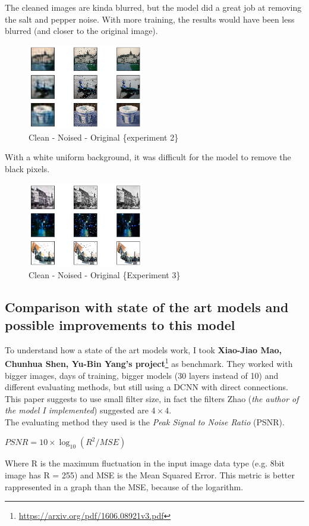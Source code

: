 \documentclass[twocolumn,showpacs,%
  nofootinbib,aps,superscriptaddress,%
  eqsecnum,prd,notitlepage,showkeys,10pt]{revtex4-1}
\begin{document}
The cleaned images are kinda blurred, but the model did a great job at removing the salt and pepper noise. With more training, the results would have been less blurred (and closer to the original image).
\begin{figure}[H]
    \includegraphics[width=0.45\textwidth]{images/prediction.png}
    \caption{\label{fig:noise}Clean - Noised - Original \{experiment 2\}}
\end{figure}
With a white uniform background, it was difficult for the model to remove the black pixels. 
\begin{figure}[H]
    \includegraphics[width=0.45\textwidth]{images/fulllastimage.png}
    \caption{\label{fig:noise}Clean - Noised - Original  \{Experiment 3\}}
\end{figure}

\subsection{Comparison with state of the art models and possible improvements to this model}
To understand how a state of the art models work, I took \textbf{Xiao-Jiao Mao, Chunhua Shen, Yu-Bin Yang's project}\footnote{\url{https://arxiv.org/pdf/1606.08921v3.pdf}} as benchmark. They worked with bigger images, days of training, bigger models (30 layers instead of 10) and different evaluating methods, but still using a DCNN with direct connections.\\
This paper suggests to use small filter size, in fact the filters Zhao (\textit{the author of the model I implemented}) suggested are $4\times4$. \\
The evaluating method they used is the \textit{Peak Signal to Noise Ratio} (PSNR).\\
\begin{center}
$PSNR=10\times{\log_{10} ({R^2/MSE})}$     
\end{center}
Where R is the maximum fluctuation in the input image data type (e.g. 8bit image has R = 255) and MSE is the Mean Squared Error. This metric is better rappresented in a graph than the MSE, because of the logarithm.
\end{document}
